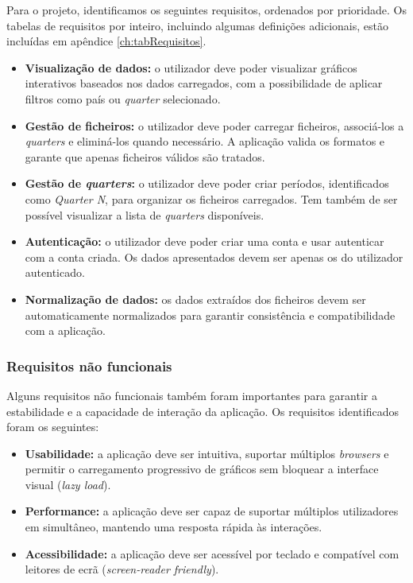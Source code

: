 Para o projeto, identificamos os seguintes requisitos, ordenados por prioridade. Os tabelas de requisitos por inteiro, incluindo algumas definições adicionais, estão incluídas em apêndice \ref{ch:tabRequisitos}.

\begin{itemize}
    \item \textbf{Visualização de dados:} o utilizador deve poder visualizar gráficos interativos baseados nos dados carregados, com a possibilidade de aplicar filtros como país ou \textit{quarter} selecionado.

    \item \textbf{Gestão de ficheiros:} o utilizador deve poder carregar ficheiros, associá-los a \textit{quarters} e eliminá-los quando necessário. A aplicação valida os formatos e garante que apenas ficheiros válidos são tratados.
    
    \item \textbf{Gestão de \textit{quarters}:} o utilizador deve poder criar períodos, identificados como \textit{Quarter N}, para organizar os ficheiros carregados. Tem também de ser possível visualizar a lista de \textit{quarters} disponíveis.

    \item \textbf{Autenticação:} o utilizador deve poder criar uma conta e usar autenticar com a conta criada. Os dados apresentados devem ser apenas os do utilizador autenticado.

    \item \textbf{Normalização de dados:} os dados extraídos dos ficheiros devem ser automaticamente normalizados para garantir consistência e compatibilidade com a aplicação.
    
\end{itemize}

\subsubsection{Requisitos não funcionais}

Alguns requisitos não funcionais também foram importantes para garantir a estabilidade e a capacidade de interação da aplicação. Os requisitos identificados foram os seguintes:

\begin{itemize}
    \item \textbf{Usabilidade:} a aplicação deve ser intuitiva, suportar múltiplos \textit{browsers} e permitir o carregamento progressivo de gráficos sem bloquear a interface visual (\textit{lazy load}).
    
    \item \textbf{Performance:} a aplicação deve ser capaz de suportar múltiplos utilizadores em simultâneo, mantendo uma resposta rápida às interações.    
    
    \item \textbf{Acessibilidade:} a aplicação deve ser acessível por teclado e compatível com leitores de ecrã (\textit{screen-reader friendly}).

\end{itemize}


